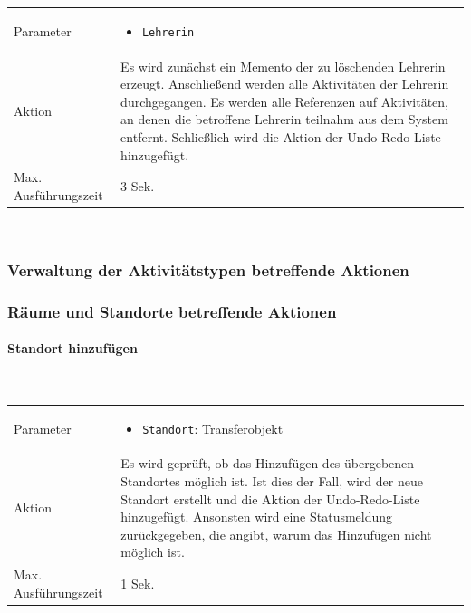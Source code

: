 \documentclass[fontsize=12pt,paper=a4,twoside]{scrartcl}
\begin{document}
\begin{tabularx}{\textwidth}{p{4cm}X}
Parameter & \begin{itemize}[itemsep=0pt, leftmargin = 0.5cm]
			\item \texttt{Lehrerin}
			\end{itemize}\\
Aktion & Es wird zunächst ein Memento der zu löschenden Lehrerin erzeugt. Anschließend werden alle Aktivitäten der Lehrerin durchgegangen. Es werden alle Referenzen auf Aktivitäten, an denen die betroffene Lehrerin teilnahm aus dem System entfernt. Schließlich wird die Aktion der Undo-Redo-Liste hinzugefügt. \\
Max. Ausführungszeit & 3 Sek. 
\end{tabularx}\\


\subsubsection{Verwaltung der Aktivitätstypen betreffende Aktionen}



\subsubsection{Räume und Standorte betreffende Aktionen}

\paragraph{Standort hinzufügen}\mbox{}\\
\begin{tabularx}{\textwidth}{p{4cm}X}
Parameter & \begin{itemize}[itemsep=0pt, leftmargin = 0.5cm]
			\item \texttt{Standort}: Transferobjekt
			\end{itemize}\\
Aktion & Es wird geprüft, ob das Hinzufügen des übergebenen Standortes möglich ist. Ist dies der Fall, wird der neue Standort erstellt und die Aktion der Undo-Redo-Liste hinzugefügt. Ansonsten wird eine Statusmeldung zurückgegeben, die angibt, warum das Hinzufügen nicht möglich ist. \\
Max. Ausführungszeit & 1 Sek. 
\end{tabularx}\\
\end{document}
